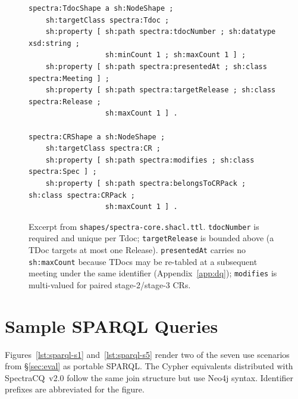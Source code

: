 \begin{figure}[h]
\centering
\scriptsize
\begin{minipage}{0.95\textwidth}
\begin{verbatim}
spectra:TdocShape a sh:NodeShape ;
    sh:targetClass spectra:Tdoc ;
    sh:property [ sh:path spectra:tdocNumber ; sh:datatype xsd:string ;
                  sh:minCount 1 ; sh:maxCount 1 ] ;
    sh:property [ sh:path spectra:presentedAt ; sh:class spectra:Meeting ] ;
    sh:property [ sh:path spectra:targetRelease ; sh:class spectra:Release ;
                  sh:maxCount 1 ] .

spectra:CRShape a sh:NodeShape ;
    sh:targetClass spectra:CR ;
    sh:property [ sh:path spectra:modifies ; sh:class spectra:Spec ] ;
    sh:property [ sh:path spectra:belongsToCRPack ; sh:class spectra:CRPack ;
                  sh:maxCount 1 ] .
\end{verbatim}
\end{minipage}
\caption{Excerpt from \texttt{shapes/\bk spectra-core.\bk shacl.\bk ttl}. \texttt{tdocNumber} is required and unique per Tdoc; \texttt{targetRelease} is bounded above (a TDoc targets at most one Release). \texttt{presentedAt} carries no \texttt{sh:maxCount} because TDocs may be re-tabled at a subsequent meeting under the same identifier (Appendix~\ref{app:dq}); \texttt{modifies} is multi-valued for paired stage-2/stage-3 CRs.}
\label{lst:shacl}
\end{figure}

\section{Sample SPARQL Queries}\label{app:sparql}

Figures~\ref{lst:sparql-s1} and~\ref{lst:sparql-s5} render two of the seven use scenarios from §\ref{sec:eval} as portable SPARQL. The Cypher equivalents distributed with SpectraCQ~v2.0 follow the same join structure but use Neo4j syntax. Identifier prefixes are abbreviated for the figure.

